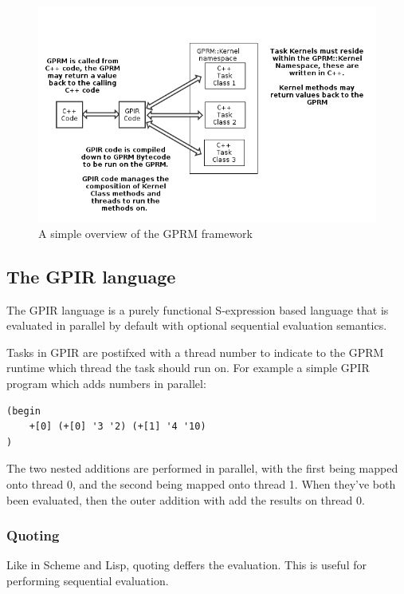 \begin{figure}[ht]
\begin{center}
\includegraphics{graphs/gprm.png}
\caption{A simple overview of the GPRM framework}
\end{center}
\end{figure}

\subsection{The GPIR language}

The GPIR language is a purely functional S-expression based language that is evaluated in parallel by default 
with optional sequential evaluation semantics.

Tasks in GPIR are postifxed with a thread number to indicate to the GPRM runtime which thread
the task should run on. For example a simple GPIR program which adds numbers in parallel:

\begin{lstlisting}[style=myGPC]
(begin
    +[0] (+[0] '3 '2) (+[1] '4 '10)
)
\end{lstlisting}

The two nested additions are performed in parallel, with the first being mapped onto thread 0,
and the second being mapped onto thread 1. When they've both been evaluated, then the outer addition
with add the results on thread 0.

\subsubsection{Quoting}

Like in Scheme and Lisp, quoting deffers the evaluation. This is useful for performing sequential evaluation.

